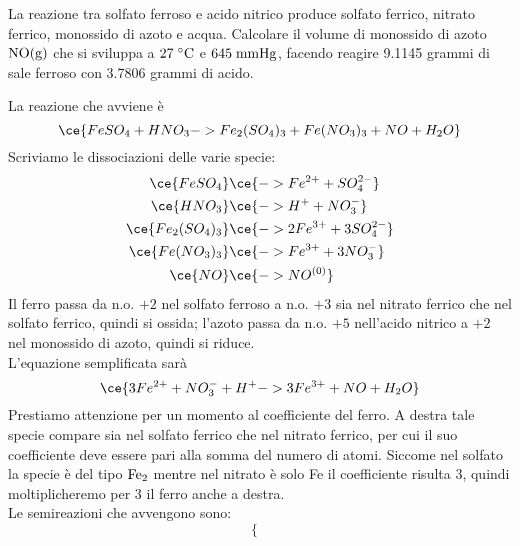 \newpage

\begin{esercizio}
    La reazione tra solfato ferroso e acido nitrico produce solfato ferrico, nitrato ferrico, monossido di azoto e acqua. Calcolare il volume di monossido di azoto $\rm NO(g)$ che si sviluppa a $27 \; ^{\circ} \rm C$ e $645 \; \rm mmHg$, facendo reagire 9.1145 grammi di sale ferroso con 3.7806 grammi di acido.
\end{esercizio}
\begin{soluzione}
    La reazione che avviene è
    \begin{equation*}
        \ce{FeSO_4 + HNO_3 -> Fe_2(SO_4)_3 + Fe(NO_3)_3 + NO + H_2O}
    \end{equation*}
    Scriviamo le dissociazioni delle varie specie:
    \begin{equation*}
        \begin{split}
            \ce{FeSO_4} & \ce{-> Fe^{2+} + SO_4^{2-}}
            \\
            \ce{HNO_3} & \ce{-> H^+ + NO_3^-}
            \\
            \ce{Fe_2(SO_4)_3} & \ce{-> 2Fe^{3+} + 3SO_4^{2-}}
            \\
            \ce{Fe(NO_3)_3} & \ce{-> Fe^{3+} + 3NO_3^-}
            \\
            \ce{NO} & \ce{-> NO^{(0)}}
            \\
        \end{split}
    \end{equation*}
    Il ferro passa da n.o. $+2$ nel solfato ferroso a n.o. $+3$ sia nel nitrato ferrico che nel solfato ferrico, quindi si ossida; l'azoto passa da n.o. $+5$ nell'acido nitrico a $+2$ nel monossido di azoto, quindi si riduce.\\
    L'equazione semplificata sarà
    \begin{equation*}
        \ce{3Fe^{2+} + NO_3^- + H^+ -> 3Fe^{3+} + NO + H_2O}
    \end{equation*}
    Prestiamo attenzione per un momento al coefficiente del ferro. A destra tale specie compare sia nel solfato ferrico che nel nitrato ferrico, per cui il suo coefficiente deve essere pari alla somma del numero di atomi. Siccome nel solfato la specie è del tipo $\rm Fe_2$ mentre nel nitrato è solo Fe il coefficiente risulta 3, quindi moltiplicheremo per 3 il ferro anche a destra.\\
    Le semireazioni che avvengono sono:
    \begin{equation*}
        \begin{cases}

\end{cases}
\end{equation*}
\end{soluzione}
